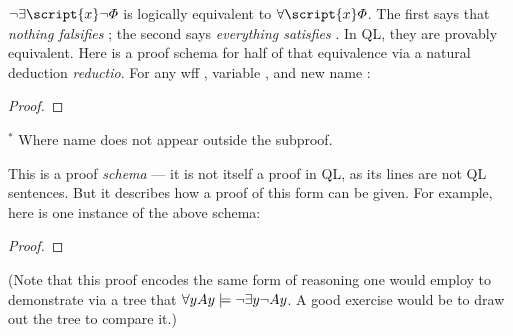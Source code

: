 $\enot\exists \script{x}\enot\metaA{}$ is logically equivalent to $\forall \script{x}\metaA{}$. The first says that \emph{nothing falsifies} \metaA{}; the second says \emph{everything satisfies} \metaA{}. In QL, they are provably equivalent. Here is a proof schema for half of that equivalence via a natural deduction \emph{reductio}. For any wff \metaA{}, variable , and new name :


\begin{proof}
	 
	\open
		\open
			\open
			\close
		\close
		\close
\end{proof}
$^\ast$ Where name  does not appear outside the subproof.

This is a proof \emph{schema} --- it is not itself a proof in QL, as its lines are not QL sentences. But it describes how a proof of this form can be given. For example, here is one instance of the above schema:


\begin{proof}
	 
	\open
		\open
			\open
			\close
		\close
	\close
\end{proof}

(Note that this proof encodes the same form of reasoning one would employ to demonstrate via a tree that $\forall y Ay \models \neg \exists y \neg Ay$. A good exercise would be to draw out the tree to compare it.)

